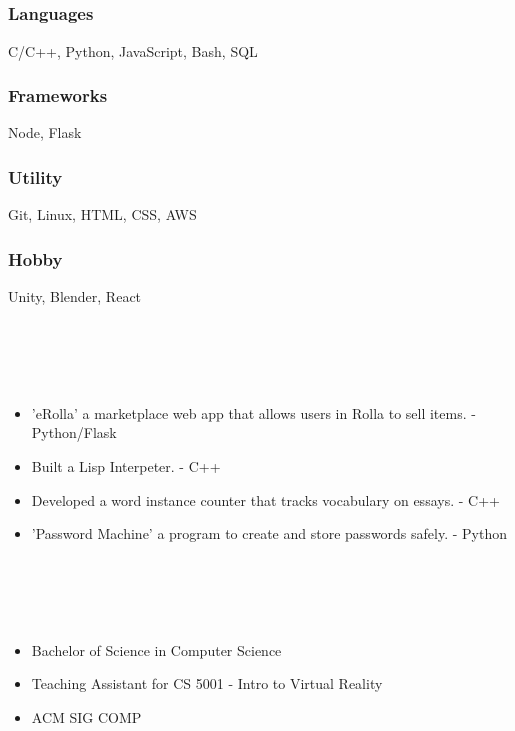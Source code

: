 \documentclass{article}
\begin{document}
\section{\\}
\subsubsection{Languages}
C/C++, Python, JavaScript, Bash, SQL 
\subsubsection{Frameworks}
Node, Flask
\subsubsection{Utility}
Git, Linux, HTML, CSS, AWS
\subsubsection{Hobby}
Unity, Blender, React
\section{\\}
\begin{itemize}
\item 'eRolla' a marketplace web app that allows users in Rolla to sell items. - Python/Flask 
\item Built a Lisp Interpeter. -  C++
\item Developed a word instance counter that tracks vocabulary on essays. - C++ 
\item 'Password Machine' a program to create and store passwords safely. - Python 
\end{itemize}
\section{\\}
\begin{itemize}
\subsection*{Missouri University of Science and Technology\hfill\mdseries Graduated May 2021}
\item Bachelor of Science in Computer Science
\item Teaching Assistant for CS 5001 - Intro to Virtual Reality
\item ACM SIG COMP
\end{itemize}
\end{document}
